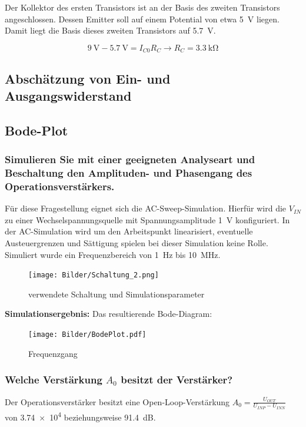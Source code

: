 Der Kollektor des ersten Transistors ist an der Basis des zweiten Transistors angeschlossen. Dessen Emitter soll auf einem Potential von etwa \SI{5}{\volt} liegen. Damit liegt die Basis dieses zweiten Transistors auf \SI{5.7}{\volt}.

\begin{equation*}
    \SI{9}{\volt} - \SI{5.7}{\volt} = I_{C0} R_C \rightarrow R_C = \SI{3.3}{\kilo \ohm}
\end{equation*}

\subsection{Abschätzung von Ein- und Ausgangswiderstand}
\subsection{Bode-Plot}
\subsubsection{Simulieren Sie mit einer geeigneten Analyseart und Beschaltung den Amplituden- und Phasengang des Operationsverstärkers.}

Für diese Fragestellung eignet sich die AC-Sweep-Simulation. Hierfür wird die $V_{IN}$ zu einer Wechselspannungsquelle mit Spannungsamplitude \SI{1}{\volt} konfiguriert. In der AC-Simulation wird um den Arbeitspunkt linearisiert, eventuelle Austeuergrenzen und Sättigung spielen bei dieser Simulation keine Rolle. Simuliert wurde ein Frequenzbereich von \SI{1}{Hz} bis \SI{10}{\mega \hertz}.

\begin{figure}[H]
    \centering
    \texttt{[image: Bilder/Schaltung\_2.png]}
    \caption{verwendete Schaltung und Simulationsparameter}
    \label{fig:my_label}
\end{figure}

\textbf{Simulationsergebnis:} Das resultierende Bode-Diagram:
\begin{figure}[H]
    \centering
    \texttt{[image: Bilder/BodePlot.pdf]}
    \caption{Frequenzgang}
    \label{fig:my_label}
\end{figure}

\subsubsection{Welche Verstärkung $A_0$ besitzt der Verstärker?}

Der Operationsverstärker besitzt eine Open-Loop-Verstärkung $A_0 = \frac{U_{OUT}}{U_{INP}-U_{INN}}$ von \num{3.74e4} beziehungsweise \SI{91.4}{dB}.

